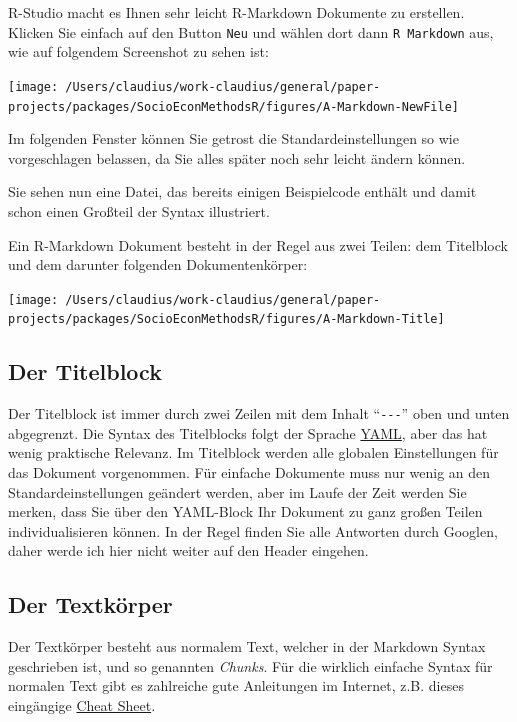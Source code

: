 \documentclass[]{book}
\begin{document}
R-Studio macht es Ihnen sehr leicht R-Markdown Dokumente zu erstellen.
Klicken Sie einfach auf den Button \texttt{Neu} und wählen dort dann
\texttt{R\ Markdown} aus, wie auf folgendem Screenshot zu sehen ist:

\begin{center}\texttt{[image: /Users/claudius/work-claudius/general/paper-projects/packages/SocioEconMethodsR/figures/A-Markdown-NewFile]} \end{center}

Im folgenden Fenster können Sie getrost die Standardeinstellungen so wie
vorgeschlagen belassen, da Sie alles später noch sehr leicht ändern
können.

Sie sehen nun eine Datei, das bereits einigen Beispielcode enthält und
damit schon einen Großteil der Syntax illustriert.

Ein R-Markdown Dokument besteht in der Regel aus zwei Teilen: dem
Titelblock und dem darunter folgenden Dokumentenkörper:

\begin{center}\texttt{[image: /Users/claudius/work-claudius/general/paper-projects/packages/SocioEconMethodsR/figures/A-Markdown-Title]} \end{center}

\subsection{Der Titelblock}\label{der-titelblock}

Der Titelblock ist immer durch zwei Zeilen mit dem Inhalt
``\texttt{-\/-\/-}'' oben und unten abgegrenzt. Die Syntax des
Titelblocks folgt der Sprache
\href{https://de.wikipedia.org/wiki/YAML}{YAML}, aber das hat wenig
praktische Relevanz. Im Titelblock werden alle globalen Einstellungen
für das Dokument vorgenommen. Für einfache Dokumente muss nur wenig an
den Standardeinstellungen geändert werden, aber im Laufe der Zeit werden
Sie merken, dass Sie über den YAML-Block Ihr Dokument zu ganz großen
Teilen individualisieren können. In der Regel finden Sie alle Antworten
durch Googlen, daher werde ich hier nicht weiter auf den Header
eingehen.

\subsection{Der Textkörper}\label{der-textkorper}

Der Textkörper besteht aus normalem Text, welcher in der Markdown Syntax
geschrieben ist, und so genannten \emph{Chunks}. Für die wirklich
einfache Syntax für normalen Text gibt es zahlreiche gute Anleitungen im
Internet, z.B. dieses eingängige
\href{https://rstudio.com/wp-content/uploads/2016/03/rmarkdown-cheatsheet-2.0.pdf}{Cheat
Sheet}.
\end{document}
